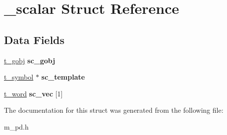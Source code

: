 \hypertarget{struct__scalar}{}\section{\+\_\+scalar Struct Reference}
\label{struct__scalar}
\subsection*{Data Fields}
\begin{DoxyCompactItemize}
\item 
\mbox{\label{struct__scalar_ad57409a25a6fe7161b4c37c6f38d2659}} 
\hyperlink{struct__gobj}{t\+\_\+gobj} {\bfseries sc\+\_\+gobj}
\item 
\mbox{\label{struct__scalar_aa3dcf6e4178004509e9f4a3d75fb5554}} 
\hyperlink{struct__symbol}{t\+\_\+symbol} $\ast$ {\bfseries sc\+\_\+template}
\item 
\mbox{\label{struct__scalar_a82e1e7b736772d6cc4c722c204b1ac18}} 
\hyperlink{unionword}{t\+\_\+word} {\bfseries sc\+\_\+vec} \mbox{[}1\mbox{]}
\end{DoxyCompactItemize}


The documentation for this struct was generated from the following file\+:\begin{DoxyCompactItemize}
\item 
m\+\_\+pd.\+h\end{DoxyCompactItemize}
